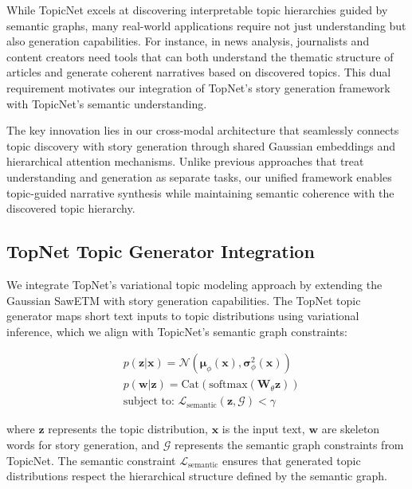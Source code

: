 \documentclass{article}
\begin{document}
While TopicNet excels at discovering interpretable topic hierarchies guided by semantic graphs, many real-world applications require not just understanding but also generation capabilities. For instance, in news analysis, journalists and content creators need tools that can both understand the thematic structure of articles and generate coherent narratives based on discovered topics. This dual requirement motivates our integration of TopNet's story generation framework with TopicNet's semantic understanding.

The key innovation lies in our cross-modal architecture that seamlessly connects topic discovery with story generation through shared Gaussian embeddings and hierarchical attention mechanisms. Unlike previous approaches that treat understanding and generation as separate tasks, our unified framework enables topic-guided narrative synthesis while maintaining semantic coherence with the discovered topic hierarchy.

\subsection{TopNet Topic Generator Integration}

We integrate TopNet's variational topic modeling approach by extending the Gaussian SawETM with story generation capabilities. The TopNet topic generator maps short text inputs to topic distributions using variational inference, which we align with TopicNet's semantic graph constraints:

\begin{equation} \label{topnet_generator}
\begin{split}
& p(\bm{z}|\bm{x}) = \mathcal{N}(\bm{\mu}_\phi(\bm{x}), \bm{\sigma}_\phi^2(\bm{x})) \\
& p(\bm{w}|\bm{z}) = \text{Cat}(\text{softmax}(\bm{W}_\theta \bm{z})) \\
& \text{subject to: } \mathcal{L}_{\text{semantic}}(\bm{z}, \mathcal{G}) < \gamma
\end{split}
\end{equation}

where $\bm{z}$ represents the topic distribution, $\bm{x}$ is the input text, $\bm{w}$ are skeleton words for story generation, and $\mathcal{G}$ represents the semantic graph constraints from TopicNet. The semantic constraint $\mathcal{L}_{\text{semantic}}$ ensures that generated topic distributions respect the hierarchical structure defined by the semantic graph.
\end{document}
